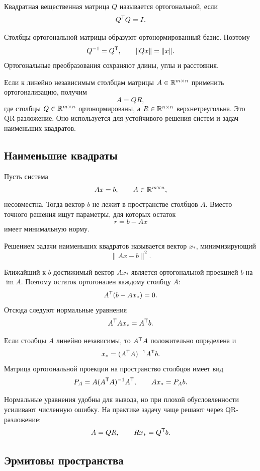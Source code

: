 \begin{definition}
Квадратная вещественная матрица \(Q\) называется ортогональной, если
\[
Q^{\mathsf{T}}Q=I.
\]
\end{definition}

Столбцы ортогональной матрицы образуют ортонормированный базис. Поэтому
\[
Q^{-1}=Q^{\mathsf{T}},
\qquad
\|Qx\|=\|x\|.
\]
Ортогональные преобразования сохраняют длины, углы и расстояния.

Если к линейно независимым столбцам матрицы \(A\in\mathbb{R}^{m\times n}\) применить ортогонализацию, получим
\[
A=QR,
\]
где столбцы \(Q\in\mathbb{R}^{m\times n}\) ортонормированы, а \(R\in\mathbb{R}^{n\times n}\) верхнетреугольна. Это QR-разложение. Оно используется для устойчивого решения систем и задач наименьших квадратов.

\subsection{Наименьшие квадраты}

Пусть система
\[
Ax=b,
\qquad
A\in\mathbb{R}^{m\times n},
\]
несовместна. Тогда вектор \(b\) не лежит в пространстве столбцов \(A\). Вместо точного решения ищут параметры, для которых остаток
\[
r=b-Ax
\]
имеет минимальную норму.

\begin{definition}
Решением задачи наименьших квадратов называется вектор \(x_\ast\), минимизирующий
\[
\|Ax-b\|^2.
\]
\end{definition}

Ближайший к \(b\) достижимый вектор \(Ax_\ast\) является ортогональной проекцией \(b\) на \(\operatorname{im}A\). Поэтому остаток ортогонален каждому столбцу \(A\):
\[
A^{\mathsf{T}}(b-Ax_\ast)=0.
\]
Отсюда следуют нормальные уравнения
\[
A^{\mathsf{T}}A x_\ast=A^{\mathsf{T}}b.
\]

Если столбцы \(A\) линейно независимы, то \(A^{\mathsf{T}}A\) положительно определена и
\[
x_\ast
=
(A^{\mathsf{T}}A)^{-1}A^{\mathsf{T}}b.
\]
Матрица ортогональной проекции на пространство столбцов имеет вид
\[
P_A
=
A(A^{\mathsf{T}}A)^{-1}A^{\mathsf{T}},
\qquad
Ax_\ast=P_A b.
\]

\begin{computationalnote}
Нормальные уравнения удобны для вывода, но при плохой обусловленности усиливают численную ошибку. На практике задачу чаще решают через QR-разложение:
\[
A=QR,
\qquad
Rx_\ast=Q^{\mathsf{T}}b.
\]
\end{computationalnote}

\subsection{Эрмитовы пространства}

